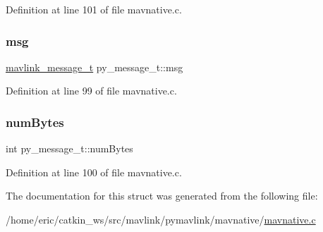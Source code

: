 Definition at line 101 of file mavnative.\+c.

\mbox{\label{structpy__message__t_ad25d53a85d0e174aa674ecaaad2d82e6}} 
\subsubsection{\texorpdfstring{msg}{msg}}
{\footnotesize\ttfamily \mbox{\hyperlink{include__v0_89_2mavlink__types_8h_a63b963764c09dc72f4910c1521e325b9}{mavlink\+\_\+message\+\_\+t}} py\+\_\+message\+\_\+t\+::msg}



Definition at line 99 of file mavnative.\+c.

\mbox{\label{structpy__message__t_a524ff7982e9326e6a1560f93b9aa325d}} 
\subsubsection{\texorpdfstring{numBytes}{numBytes}}
{\footnotesize\ttfamily int py\+\_\+message\+\_\+t\+::num\+Bytes}



Definition at line 100 of file mavnative.\+c.



The documentation for this struct was generated from the following file\+:\begin{DoxyCompactItemize}
\item 
/home/eric/catkin\+\_\+ws/src/mavlink/pymavlink/mavnative/\mbox{\hyperlink{mavnative_8c}{mavnative.\+c}}\end{DoxyCompactItemize}
